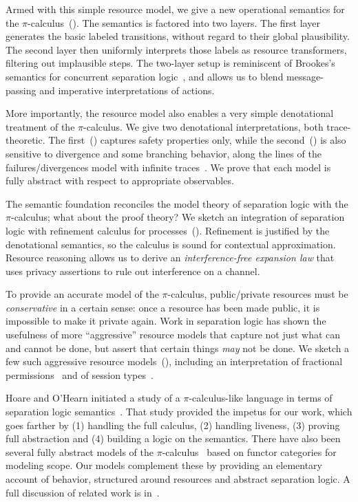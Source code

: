 \documentclass{entcs}
\begin{document}
Armed with this simple resource model, we give a new operational
semantics for the $\pi$-calculus~().  The
semantics is factored into two layers.  The first layer generates the
basic labeled transitions, without regard to their global
plausibility.  The second layer then uniformly interprets those labels
as resource transformers, filtering out implausible steps.  The
two-layer setup is reminiscent of Brookes's semantics for concurrent
separation logic~\cite{Brookes2007,Brookes2002}, and allows us to
blend message-passing and imperative interpretations of actions.



More importantly, the resource model also enables a very simple
denotational treatment of the $\pi$-calculus.  We give two
denotational interpretations, both trace-theoretic.  The
first~() captures safety properties only, while the
second~() is also sensitive to divergence and some
branching behavior, along the lines of the failures/divergences model
with infinite traces~\cite{Roscoe1993}.  We prove that each model is
fully abstract with respect to  appropriate observables.


The semantic foundation reconciles the model theory of separation
logic with the $\pi$-calculus; what about the proof theory?  We sketch
an integration of separation logic with refinement calculus for
processes~().  Refinement is justified by the
denotational semantics, so the calculus is sound for contextual
approximation.  Resource reasoning allows us to derive an
\emph{interference-free expansion law} that uses privacy assertions to
rule out interference on a channel.



To provide an accurate model of the $\pi$-calculus, public/private
resources must be \emph{conservative} in a certain sense: once a
resource has been made public, it is impossible to make it private
again.  Work in separation logic has shown the usefulness of more
``aggressive'' resource models that capture not just what can and
cannot be done, but assert that certain things \emph{may} not be done.
We sketch a few such aggressive resource models~(),
including an interpretation of fractional
permissions~\cite{Boyland2003} and of session types~\cite{Honda1998}.

Hoare and O'Hearn initiated a study of a $\pi$-calculus-like language
in terms of separation logic semantics~\cite{Hoare2008}.  That study
provided the impetus for our work, which goes farther by (1) handling
the full calculus, (2) handling liveness, (3) proving full abstraction
and (4) building a logic on the semantics.  There have also been
several fully abstract models of the
$\pi$-calculus~\cite{Stark2002,Hennessy2002,Fiore2002} based on
functor categories for modeling scope.  Our models
complement these by providing an elementary account of behavior,
structured around resources and abstract separation logic.  A full
discussion of related work is in~.
\end{document}
